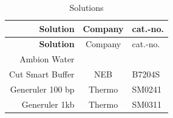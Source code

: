 \documentclass[11pt,singlespacinge,twoside]{reedthesis} %
\begin{document}
\begin{longtable}[]{@{}rcl@{}}
\caption{\label{tab:mat-sol} Solutions}\tabularnewline
\toprule
\begin{minipage}[b]{0.21\columnwidth}\raggedleft
\textbf{Solution}\strut
\end{minipage} & \begin{minipage}[b]{0.54\columnwidth}\centering
Company\strut
\end{minipage} & \begin{minipage}[b]{0.16\columnwidth}\raggedright
cat.-no.\strut
\end{minipage}\tabularnewline
\midrule
\endfirsthead
\toprule
\begin{minipage}[b]{0.21\columnwidth}\raggedleft
\textbf{Solution}\strut
\end{minipage} & \begin{minipage}[b]{0.54\columnwidth}\centering
Company\strut
\end{minipage} & \begin{minipage}[b]{0.16\columnwidth}\raggedright
cat.-no.\strut
\end{minipage}\tabularnewline
\midrule
\endhead
\begin{minipage}[t]{0.21\columnwidth}\raggedleft
Ambion Water\strut
\end{minipage} & \begin{minipage}[t]{0.54\columnwidth}\centering
\strut
\end{minipage} & \begin{minipage}[t]{0.16\columnwidth}\raggedright
\strut
\end{minipage}\tabularnewline
\begin{minipage}[t]{0.21\columnwidth}\raggedleft
Cut Smart Buffer\strut
\end{minipage} & \begin{minipage}[t]{0.54\columnwidth}\centering
NEB\strut
\end{minipage} & \begin{minipage}[t]{0.16\columnwidth}\raggedright
B7204S\strut
\end{minipage}\tabularnewline
\begin{minipage}[t]{0.21\columnwidth}\raggedleft
Generuler 100 bp\strut
\end{minipage} & \begin{minipage}[t]{0.54\columnwidth}\centering
Thermo\strut
\end{minipage} & \begin{minipage}[t]{0.16\columnwidth}\raggedright
SM0241\strut
\end{minipage}\tabularnewline
\begin{minipage}[t]{0.21\columnwidth}\raggedleft
Generuler 1kb\strut
\end{minipage} & \begin{minipage}[t]{0.54\columnwidth}\centering
Thermo\strut
\end{minipage} & \begin{minipage}[t]{0.16\columnwidth}\raggedright
SM0311\strut
\end{minipage}\tabularnewline
\bottomrule
\end{longtable}
\end{document}
